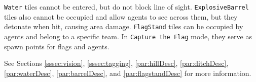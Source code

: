 \documentclass[a4paper,english,DIV=16,11pt,parskip=half,dvipsnames,listof=totoc,index=totoc,bibliography=totoc]{scrartcl}
\begin{document}
\texttt{Water} tiles cannot be entered, but do not block line of sight. \texttt{ExplosiveBarrel} tiles also cannot be occupied and allow agents to see across them, but they detonate when hit, causing area damage. \texttt{FlagStand} tiles can be occupied by agents and belong to a specific team. In \texttt{Capture the Flag} mode, they serve as spawn points for flags and agents.

See Sections \ref{sssec:vision}, \ref{sssec:tagging}, \ref{par:hillDesc}, \ref{par:ditchDesc}, \ref{par:waterDesc}, \ref{par:barrelDesc}, and \ref{par:flagstandDesc} for more information.
\end{document}
